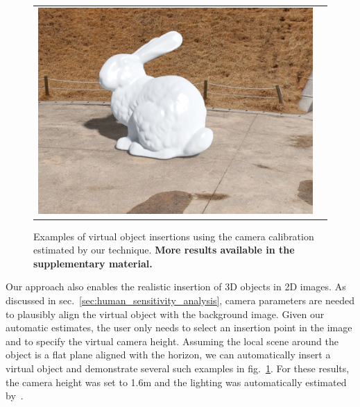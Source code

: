 \begin{figure}
\begin{tabular}{@{}cc@{}}
\includegraphics[width=\voiwidth\linewidth]{figures/applications/virtual_object_insertions/pano_abpebgbgmpccye_jpg-6_5_es.png}
\end{tabular}
\caption[Examples of virtual object insertion]{Examples of virtual object insertions using the camera calibration estimated by our technique. \textbf{More results available in the supplementary material.}\vspace{-0.5em}}
\label{fig:applications_virtual_object_insertion}
\end{figure}

Our approach also enables the realistic insertion of 3D objects in 2D images. As discussed in sec.~\ref{sec:human_sensitivity_analysis}, camera parameters are needed to plausibly align the virtual object with the background image. Given our automatic estimates, the user only needs to select an insertion point in the image and to specify the virtual camera height. Assuming the local scene around the object is a flat plane aligned with the horizon, we can automatically insert a virtual object and demonstrate several such examples in fig.~\ref{fig:applications_virtual_object_insertion}. For these results, the camera height was set to 1.6m and the lighting was automatically estimated by~\cite{holdgeoffroy-cvpr-17,gardner-sigasia-17}.

